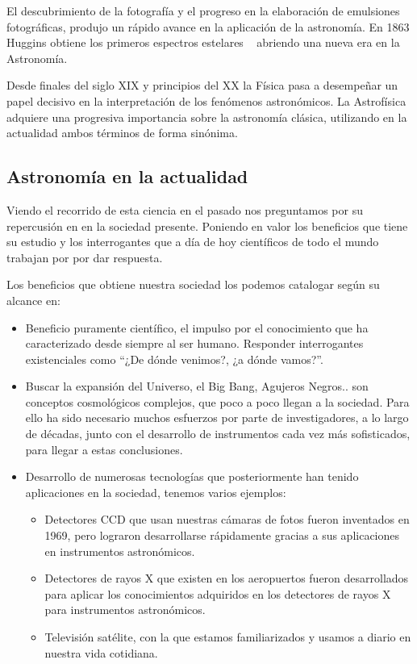 \bigskip
El descubrimiento de la fotografía y el progreso en la elaboración de emulsiones fotográficas, produjo un rápido avance en la aplicación de la astronomía. En 1863 Huggins obtiene los primeros espectros estelares ~\cite{analisispectal} abriendo una nueva era en la Astronomía\cite{huggins}.

\bigskip
Desde finales del siglo XIX y principios del XX la Física pasa a desempeñar un papel decisivo en la interpretación de los fenómenos astronómicos. La Astrofísica\cite{astrofisica} adquiere una progresiva importancia sobre la astronomía clásica, utilizando en la actualidad ambos términos de forma sinónima.

\subsection{Astronomía en la actualidad}

Viendo el recorrido de esta ciencia en el pasado nos preguntamos por su repercusión en en la sociedad presente. Poniendo en valor los beneficios que tiene su estudio y los interrogantes que a día de hoy científicos de todo el mundo trabajan por por dar respuesta.  \cite{beneficiosastro}

\bigskip
Los beneficios que obtiene nuestra sociedad los podemos catalogar según su alcance en:
\begin{itemize}
	\item Beneficio puramente científico, el impulso por el conocimiento que ha caracterizado desde siempre al ser humano. Responder interrogantes existenciales como “¿De dónde venimos?, ¿a dónde vamos?”.


	\item Buscar la expansión del Universo, el Big Bang, Agujeros Negros.. son conceptos cosmológicos complejos, que poco a poco  llegan a la sociedad. Para ello ha sido necesario  muchos esfuerzos por parte de investigadores, a lo largo de décadas, junto con el desarrollo de instrumentos cada vez más sofisticados, para llegar a estas conclusiones. 

	\item Desarrollo de numerosas tecnologías que posteriormente han tenido aplicaciones en la sociedad, tenemos varios ejemplos:   \cite{beneficiosastro2}
	
	
	\begin{itemize}
		\item Detectores CCD que usan nuestras cámaras de fotos fueron inventados en 1969, pero lograron desarrollarse rápidamente gracias a sus aplicaciones en instrumentos astronómicos.
		
		\item Detectores de  rayos X que existen en los aeropuertos fueron desarrollados  para aplicar los  conocimientos  adquiridos en los detectores de rayos X para instrumentos astronómicos. 
		
		\item Televisión satélite, con la que estamos familiarizados y usamos a diario en nuestra vida cotidiana. 
		
	\end{itemize}
\end{itemize}

